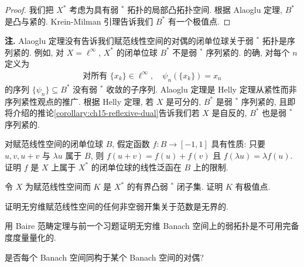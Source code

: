 \documentclass[../../main.tex]{subfiles}
\begin{document}
\begin{proof}
我们把 $X^{*}$ 考虑为具有弱 $^{*}$ 拓扑的局部凸拓扑空间. 根据 Alaoglu 定理, $B^{*}$ 是凸与紧的. Krein-Milman 引理告诉我们 $B^{*}$ 有一个极值点.
\end{proof}

\medskip\par\noindent\textbf{注.} 
Alaoglu 定理没有告诉我们赋范线性空间的对偶的闭单位球关于弱 $^{*}$ 拓扑是序列紧的. 例如, 对 $X=\ell^{\infty}$, $X^{*}$ 的闭单位球 $B^{*}$ 不是弱 $^{*}$ 序列紧的. 的确, 对每个 $n$ 定义为
\begin{align*}
\text{对所有 }\{x_{k}\}\in\ell^{\infty},\quad\psi_{n}(\{x_{k}\})=x_{n}
\end{align*}
的序列 $\{\psi_{n}\}\subseteq B^{*}$ 没有弱 $^{*}$ 收敛的子序列. Alaoglu 定理是 Helly 定理从紧性而非序列紧性观点的推广. 根据 Helly 定理, 若 $X$ 是可分的, $B^{*}$ 是弱 $^{*}$ 序列紧的, 且即将介绍的推论\cref{corollary:ch15-reflexive-dual}告诉我们若 $X$ 是自反的, $B^{*}$ 也是弱 $^{*}$ 序列紧的.


\begin{exercise}\label{exercise:ch15-01}
对赋范线性空间的闭单位球 $B$, 假定函数 $f:B\to[-1,1]$ 具有性质: 只要 $u,v,u+v$ 与 $\lambda u$ 属于 $B$, 则 $f(u+v)=f(u)+f(v)$ 且 $f(\lambda u)=\lambda f(u)$. 证明 $f$ 是 $X$ 上属于 $X^{*}$ 的闭单位球的线性泛函在 $B$ 上的限制.
\end{exercise}

\begin{exercise}\label{exercise:ch15-02}
令 $X$ 为赋范线性空间而 $K$ 是 $X^{*}$ 的有界凸弱 $^{*}$ 闭子集. 证明 $K$ 有极值点.
\end{exercise}

\begin{exercise}\label{exercise:ch15-03}
证明无穷维赋范线性空间的任何非空弱开集关于范数是无界的.
\end{exercise}

\begin{exercise}\label{exercise:ch15-04}
用 Baire 范畴定理与前一个习题证明无穷维 Banach 空间上的弱拓扑是不可用完备度度量量化的.
\end{exercise}

\begin{exercise}\label{exercise:ch15-05}
是否每个 Banach 空间同构于某个 Banach 空间的对偶?
\end{exercise}
\end{document}
